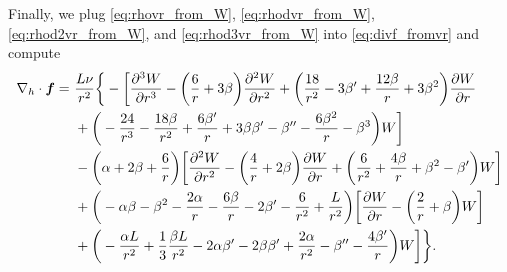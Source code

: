 \documentclass[12pt]{article} %
\newcommand{\pderiv}[2]{\frac{\partial#1}{\partial#2}}
\newcommand{\ppderiv}[2]{\frac{\partial^2#1}{\partial#2^2}}
\newcommand{\pppderiv}[2]{\frac{\partial^3#1}{\partial#2^3}}
\newcommand{\divh}{\nabla_h\cdot}
\newcommand{\db}{\beta^\prime}
\newcommand{\ddb}{\beta^{\prime\prime}}
\begin{document}
	Finally, we plug \eqref{eq:rhovr_from_W}, \eqref{eq:rhodvr_from_W},  \eqref{eq:rhod2vr_from_W}, and  \eqref{eq:rhod3vr_from_W} into \eqref{eq:divf_fromvr} and compute
	\begin{align}
	\divh\bm{f} =\ &\frac{L\nu}{r^2}\bigg{\{}-\bigg{[}\pppderiv{W}{r} -\bigg{(}\frac{6}{r}+3\beta \bigg{)}\ppderiv{W}{r} + \bigg{(}\frac{18}{r^2}-3\db + \frac{12\beta}{r} + 3\beta^2\bigg{)}\pderiv{W}{r}\nonumber\\
   &+\bigg{(}-\frac{24}{r^3} - \frac{18\beta}{r^2} + \frac{6\db}{r}+3\beta\db-\ddb - \frac{6\beta^2}{r} - \beta^3\bigg{)}W\bigg{]}\nonumber\\
   &- \bigg{(}\alpha + 2\beta + \frac{6}{r}\bigg{)}\bigg{[}\ppderiv{W}{r}-\bigg{(}\frac{4}{r}+2\beta\bigg{)}\pderiv{W}{r}+\bigg{(}\frac{6}{r^2}+\frac{4\beta}{r}+\beta^2-\db\bigg{)}W\bigg{]} \nonumber\\
   &+ \bigg{(}-\alpha\beta-\beta^2-\frac{2\alpha}{r}-\frac{6\beta}{r}-2\db - \frac{6}{r^2}+\frac{L}{r^2}\bigg{)}\bigg{[}\pderiv{W}{r}-\bigg{(}\frac{2}{r}+\beta\bigg{)}W\bigg{]} \nonumber\\
	&+ \bigg{(}-\frac{\alpha L}{r^2} +\frac{1}{3}\frac{\beta L}{r^2}- 2\alpha\db - 2\beta\db + \frac{2\alpha}{r^2} - \ddb - \frac{4\db}{r}\bigg{)}W\bigg{]}\bigg{\}}.
	\end      {align}
\end{document}
